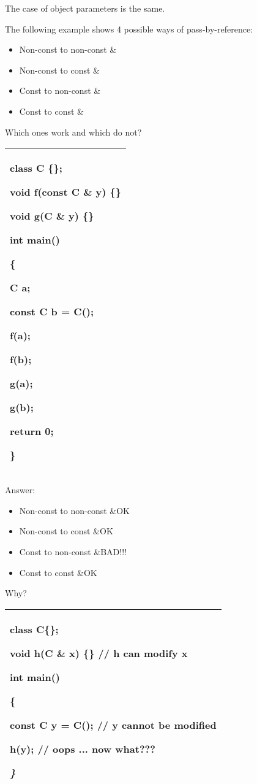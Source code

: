 \documentclass[
]{article}
\providecommand{\tightlist}{%
  \setlength{\itemsep}{0pt}\setlength{\parskip}{0pt}}
\begin{document}
The case of object parameters is the same.

The following example shows 4 possible ways of pass-by-reference:

\begin{itemize}
\tightlist
\item
  Non-const to non-const \&
\item
  Non-const to const \&
\item
  Const to non-const \&
\item
  Const to const \&
\end{itemize}

Which ones work and which do not?

\begin{longtable}[]{@{}l@{}}
\toprule
\endhead
\begin{minipage}[t]{0.97\columnwidth}\raggedright
class C \{\};

void f(const C \& y) \{\}

void g(C \& y) \{\}

int main()

\{

C a;

const C b = C();

f(a);

f(b);

g(a);

g(b);

return 0;

\}\strut
\end{minipage}\tabularnewline
\bottomrule
\end{longtable}

Answer:

\begin{itemize}
\tightlist
\item
  Non-const to non-const \&OK
\item
  Non-const to const \&OK
\item
  Const to non-const \&BAD!!!
\item
  Const to const \&OK
\end{itemize}

Why?

\begin{longtable}[]{@{}l@{}}
\toprule
\endhead
\begin{minipage}[t]{0.97\columnwidth}\raggedright
class C\{\};

void h(C \& x) \{\} // h can modify x

int main()

\{

const C y = C(); // y cannot be modified

h(y); // oops ... now what???

\emph{\}} \strut
\end{minipage}\tabularnewline
\bottomrule
\end{longtable}
\end{document}
